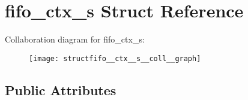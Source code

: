 \hypertarget{structfifo__ctx__s}{}\section{fifo\+\_\+ctx\+\_\+s Struct Reference}
\label{structfifo__ctx__s}


Collaboration diagram for fifo\+\_\+ctx\+\_\+s\+:\nopagebreak
\begin{figure}[H]
\begin{center}
\leavevmode
\texttt{[image: structfifo\_\_ctx\_\_s\_\_coll\_\_graph]}
\end{center}
\end{figure}
\subsection*{Public Attributes}
